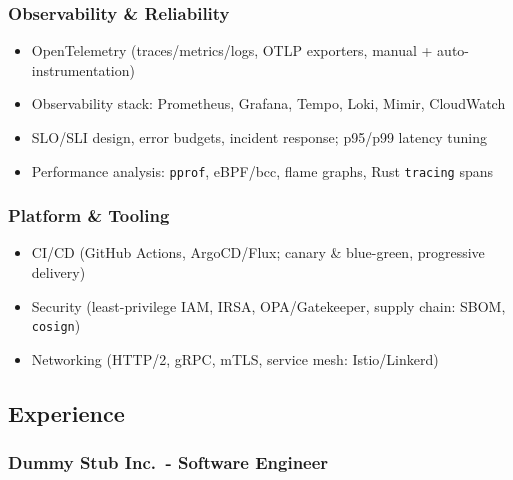 \documentclass[
  10pt,
  a4paper,
]{extarticle}
\providecommand{\tightlist}{%
  \setlength{\itemsep}{0pt}\setlength{\parskip}{0pt}}
\begin{document}
\subsubsection{Observability \&
Reliability}\label{observability-reliability}

\begin{itemize}
\tightlist
\item
  OpenTelemetry (traces/metrics/logs, OTLP exporters, manual +
  auto-instrumentation)
\item
  Observability stack: Prometheus, Grafana, Tempo, Loki, Mimir,
  CloudWatch
\item
  SLO/SLI design, error budgets, incident response; p95/p99 latency
  tuning
\item
  Performance analysis: \texttt{pprof}, eBPF/bcc, flame graphs, Rust
  \texttt{tracing} spans
\end{itemize}

\subsubsection{Platform \& Tooling}\label{platform-tooling}

\begin{itemize}
\tightlist
\item
  CI/CD (GitHub Actions, ArgoCD/Flux; canary \& blue-green, progressive
  delivery)
\item
  Security (least-privilege IAM, IRSA, OPA/Gatekeeper, supply chain:
  SBOM, \texttt{cosign})
\item
  Networking (HTTP/2, gRPC, mTLS, service mesh: Istio/Linkerd)
\end{itemize}

\subsection{Experience}\label{experience}

\subsubsection{Dummy Stub Inc.~- Software
Engineer}\label{dummy-stub-inc.---software-engineer}

%
  {\selectfont
  \noindent\makebox[\linewidth]{%
    \textcolor{black}{Freelance}\hfill
  }}\par{}

%
  {\selectfont
  \noindent{}}\par{}
\end{document}

